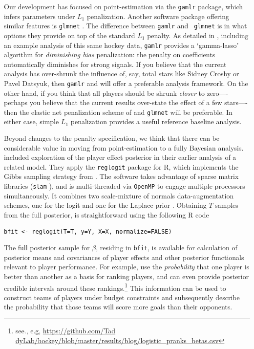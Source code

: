 Our development has focused on point-estimation via the {\tt gamlr} package,
which infers parameters under $L_1$ penalization.  Another software package
offering similar features is {\tt glmnet}
\cite{zou_regularization_2005}.  The difference between {\tt gamlr} and {\tt
glmnet} is in what options they provide on top of the standard $L_1$ penalty.
As detailed in \cite{taddy_one-step_2015}, including an example analysis of
this same hockey data, {\tt gamlr} provides a `gamma-lasso' algorithm for
\textit{diminishing bias} penalization: the penalty on coefficients
automatically diminishes for strong signals.  If you believe that the current
analysis has over-shrunk the influence of, say, total stars like Sidney Crosby
or Pavel Datsyuk, then {\tt gamlr} and \cite{taddy_one-step_2015} will offer a
preferable analysis framework.  On the other hand, if you think that all
players should be shrunk \textit{closer} to zero----perhaps you believe that
the current results over-state the effect of a few stars----then the elastic
net penalization scheme of \cite{zou_regularization_2005} and {\tt glmnet}
will be preferable.  In either case, simple $L_1$ penalization provides a
useful reference baseline analysis.

Beyond changes to the penalty specification, we think that there can be
considerable value in moving from point-estimation to a fully Bayesian
analysis. \cite{gramacy:jensen:taddy:2013}
included exploration of the player effect posterior in their earlier analysis of a related model.  They apply the {\tt reglogit}
package \cite{reglogit} for {\sf R}, which implements the Gibbs sampling strategy
from \cite{gra:pols:2012}. The software takes advantage of
sparse matrix libraries ({\tt slam} \cite{slam}), and is multi-threaded via
{\tt OpenMP} to engage multiple processors simultaneously.  
It combines two scale-mixture of normals data-augmentation schemes, one for the logit
\cite{holmes:held:2006} and one for the Laplace prior \cite{park:casella:2008}.
Obtaining $T$ samples from the full posterior, is straightforward using the
following {\sf R} code
\begin{verbatim}
bfit <- reglogit(T=T, y=Y, X=X, normalize=FALSE)
\end{verbatim}
The full posterior sample for $\beta$, residing in {\tt bfit}, is available for calculation of posterior means and covariances of player effects and other posterior functionals relevant to player performance. For example, \cite{gramacy:jensen:taddy:2013} use the \textit{probability} that one player is better than
another as a basis for ranking players, and can even provide posterior credible intervals around these rankings.\footnote{see., e.g, 
\url{https://github.com/Tad dyLab/hockey/blob/master/results/blog/logistic_pranks_betas.csv}
}  This information can be used to construct teams of players under budget constraints and
subsequently describe the probability that those teams will score more goals
than their opponents.  

